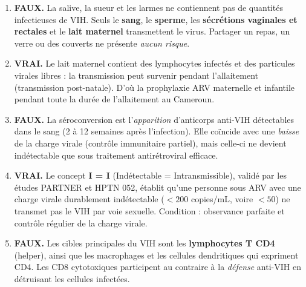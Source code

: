 \documentclass[11pt]{article}
\newcommand{\cle}[1]{{\popxbold\color{popdark}#1}}
\begin{document}
\begin{corrige}
\begin{enumerate}
    \item \textbf{FAUX.} La salive, la sueur et les larmes ne contiennent pas de quantités infectieuses de VIH. Seuls le \textbf{sang}, le \textbf{sperme}, les \textbf{sécrétions vaginales et rectales} et le \textbf{lait maternel} transmettent le virus. Partager un repas, un verre ou des couverts ne présente \emph{aucun risque}.
    \item \textbf{VRAI.} Le lait maternel contient des lymphocytes infectés et des particules virales libres : la transmission peut survenir pendant l'allaitement (transmission post-natale). D'où la prophylaxie ARV maternelle et infantile pendant toute la durée de l'allaitement au Cameroun.
    \item \textbf{FAUX.} La \cle{séroconversion} est l'\emph{apparition} d'anticorps anti-VIH détectables dans le sang (2 à 12 semaines après l'infection). Elle coïncide avec une \emph{baisse} de la charge virale (contrôle immunitaire partiel), mais celle-ci ne devient indétectable que sous traitement antirétroviral efficace.
    \item \textbf{VRAI.} Le concept \textbf{I = I} (Indétectable = Intransmissible), validé par les études PARTNER et HPTN 052, établit qu'une personne sous ARV avec une charge virale durablement indétectable ($< 200$ copies/mL, voire $< 50$) ne transmet pas le VIH par voie sexuelle. Condition : observance parfaite et contrôle régulier de la charge virale.
    \item \textbf{FAUX.} Les cibles principales du VIH sont les \textbf{lymphocytes T CD4} (helper), ainsi que les macrophages et les cellules dendritiques qui expriment CD4. Les CD8 cytotoxiques participent au contraire à la \emph{défense} anti-VIH en détruisant les cellules infectées.
\end{enumerate}
\end{corrige}
\end{document}
